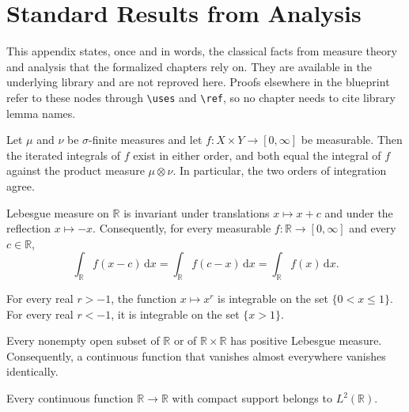 \chapter{Standard Results from Analysis}

This appendix states, once and in words, the classical facts from measure theory and analysis that the formalized chapters rely on. They are available in the underlying library and are not reproved here. Proofs elsewhere in the blueprint refer to these nodes through \verb|\uses| and \verb|\ref|, so no chapter needs to cite library lemma names.

\begin{theorem}[Tonelli]\label{thm:std_tonelli}
\mathlibok
Let $\mu$ and $\nu$ be $\sigma$-finite measures and let $f : X \times Y \to [0, \infty]$ be measurable. Then the iterated integrals of $f$ exist in either order, and both equal the integral of $f$ against the product measure $\mu \otimes \nu$. In particular, the two orders of integration agree.
\end{theorem}

\begin{theorem}\label{thm:std_translation_invariance}
\mathlibok
Lebesgue measure on $\mathbb{R}$ is invariant under translations $x \mapsto x + c$ and under the reflection $x \mapsto -x$. Consequently, for every measurable $f : \mathbb{R} \to [0, \infty]$ and every $c \in \mathbb{R}$,
\[
  \int_{\mathbb{R}} f(x - c) \, \mathrm{d}x = \int_{\mathbb{R}} f(c - x) \, \mathrm{d}x = \int_{\mathbb{R}} f(x) \, \mathrm{d}x.
\]
\end{theorem}

\begin{theorem}\label{thm:std_power_integrability}
\mathlibok
For every real $r > -1$, the function $x \mapsto x^r$ is integrable on the set $\{0 < x \le 1\}$. For every real $r < -1$, it is integrable on the set $\{x > 1\}$.
\end{theorem}

\begin{theorem}\label{thm:std_open_positive}
\mathlibok
Every nonempty open subset of $\mathbb{R}$ or of $\mathbb{R} \times \mathbb{R}$ has positive Lebesgue measure. Consequently, a continuous function that vanishes almost everywhere vanishes identically.
\end{theorem}

\begin{theorem}\label{thm:std_compact_support_L2}
\mathlibok
Every continuous function $\mathbb{R} \to \mathbb{R}$ with compact support belongs to $L^2(\mathbb{R})$.
\end{theorem}

